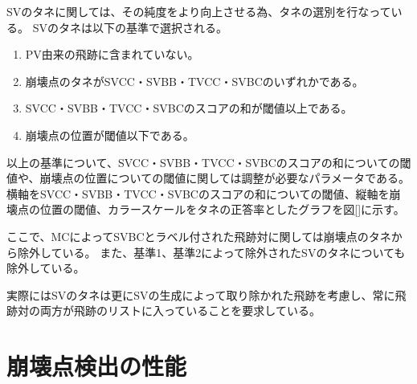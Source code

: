 SVのタネに関しては、その純度をより向上させる為、タネの選別を行なっている。
SVのタネは以下の基準で選択される。

\begin{enumerate}
 \item PV由来の飛跡に含まれていない。
 \item 崩壊点のタネがSVCC・SVBB・TVCC・SVBCのいずれかである。
 \item SVCC・SVBB・TVCC・SVBCのスコアの和が閾値以上である。
 \item 崩壊点の位置が閾値以下である。
\end{enumerate}

以上の基準について、SVCC・SVBB・TVCC・SVBCのスコアの和についての閾値や、崩壊点の位置についての閾値に関しては調整が必要なパラメータである。
横軸をSVCC・SVBB・TVCC・SVBCのスコアの和についての閾値、縦軸を崩壊点の位置の閾値、カラースケールをタネの正答率としたグラフを図\ref{}に示す。

ここで、MCによってSVBCとラベル付された飛跡対に関しては崩壊点のタネから除外している。
また、基準1、基準2によって除外されたSVのタネについても除外している。

実際にはSVのタネは更にSVの生成によって取り除かれた飛跡を考慮し、常に飛跡対の両方が飛跡のリストに入っていることを要求している。




\section{崩壊点検出の性能} \label{VFDL:SummaryofVFDL}






















